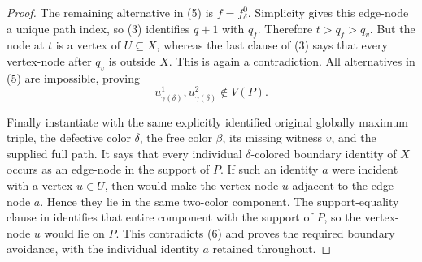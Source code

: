 \begin{proof}
The remaining alternative in (5) is $f=f^0_\delta$.  Simplicity gives
this edge-node a unique path index, so (3) identifies $q+1$ with $q_f$.
Therefore $t>q_f>q_v$.  But the node at $t$ is a vertex of $U\subseteq X$,
whereas the last clause of (3) says that every vertex-node after $q_v$
is outside $X$.  This is again a contradiction.  All alternatives in
(5) are impossible, proving
\[
       u^1_{\gamma(\delta)},u^2_{\gamma(\delta)}\notin V(P).        \tag{6}
\]

Finally instantiate  with
the same explicitly identified original globally maximum triple, the
defective color $\delta$, the free color $\beta$, its missing witness
$v$, and the supplied full path.  It says that every individual
$\delta$-colored boundary identity of $X$ occurs as an edge-node in the
support of $P$.  If such an identity $a$ were incident with a vertex
$u\in U$, then  would make the
vertex-node $u$ adjacent to the edge-node $a$.  Hence they lie in the
same two-color component.  The support-equality clause in
 identifies that entire component
with the support of $P$, so the vertex-node $u$ would lie on $P$.
This contradicts (6) and proves the required boundary avoidance, with
the individual identity $a$ retained throughout.
\end{proof}
